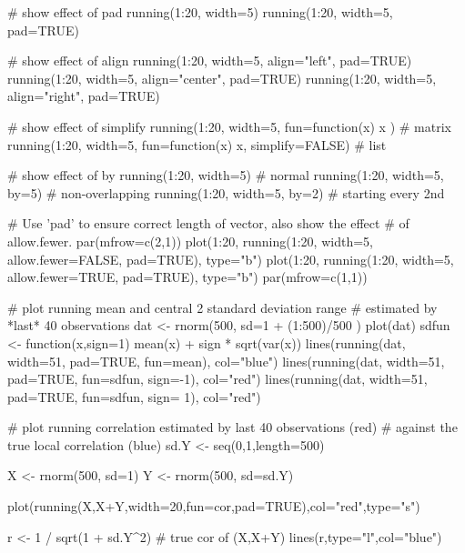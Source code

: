 \begin{Examples}
\begin{ExampleCode}

# show effect of pad
running(1:20, width=5)
running(1:20, width=5, pad=TRUE)

# show effect of align
running(1:20, width=5, align="left", pad=TRUE)
running(1:20, width=5, align="center", pad=TRUE)
running(1:20, width=5, align="right", pad=TRUE)

# show effect of simplify
running(1:20, width=5, fun=function(x) x )  # matrix
running(1:20, width=5, fun=function(x) x, simplify=FALSE) # list

# show effect of by
running(1:20, width=5)       # normal
running(1:20, width=5, by=5) # non-overlapping
running(1:20, width=5, by=2) # starting every 2nd

# Use 'pad' to ensure correct length of vector, also show the effect
# of allow.fewer.
par(mfrow=c(2,1))
plot(1:20, running(1:20, width=5, allow.fewer=FALSE, pad=TRUE), type="b")
plot(1:20, running(1:20, width=5, allow.fewer=TRUE,  pad=TRUE), type="b")
par(mfrow=c(1,1))

# plot running mean and central 2 standard deviation range
# estimated by *last* 40 observations
dat <- rnorm(500, sd=1 + (1:500)/500 )
plot(dat)
sdfun <- function(x,sign=1) mean(x) + sign * sqrt(var(x))
lines(running(dat, width=51, pad=TRUE, fun=mean), col="blue")
lines(running(dat, width=51, pad=TRUE, fun=sdfun, sign=-1), col="red")
lines(running(dat, width=51, pad=TRUE, fun=sdfun, sign= 1), col="red")

# plot running correlation estimated by last 40 observations (red)
# against the true local correlation (blue)
sd.Y <- seq(0,1,length=500)

X <- rnorm(500, sd=1)
Y <- rnorm(500, sd=sd.Y)

plot(running(X,X+Y,width=20,fun=cor,pad=TRUE),col="red",type="s")

r <- 1 / sqrt(1 + sd.Y^2) # true cor of (X,X+Y)
lines(r,type="l",col="blue")
\end{ExampleCode}
\end{Examples}


